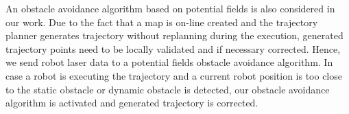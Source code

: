 An obstacle avoidance algorithm based on potential fields is also considered in our work. Due to the fact that a map is on-line created and the trajectory planner generates trajectory without replanning during the execution, generated trajectory points need to be locally validated and if necessary corrected. Hence, we send robot laser data to a potential fields obstacle avoidance algorithm. In case a robot is executing the trajectory and a current robot position is too close to the static obstacle or dynamic obstacle is detected, our obstacle avoidance algorithm is activated and generated trajectory is corrected.  


